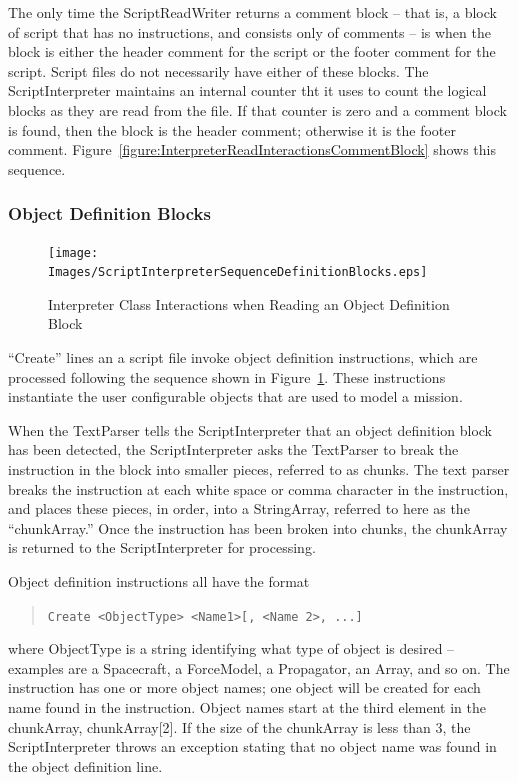 The only time the ScriptReadWriter returns a comment block -- that is, a block of script that has
no instructions, and consists only of comments -- is when the block is either the header comment
for the script or the footer comment for the script.  Script files do not necessarily have either
of these blocks.  The ScriptInterpreter maintains an internal counter tht it uses to count the
logical blocks as they are read from the file.  If that counter is zero and a comment block is
found, then the block is the header comment; otherwise it is the footer comment.
Figure~\ref{figure:InterpreterReadInteractionsCommentBlock} shows this sequence.

\subsubsection{Object Definition Blocks}

\begin{figure}
\begin{center}
\texttt{[image: Images/ScriptInterpreterSequenceDefinitionBlocks.eps]}
\caption{\label{figure:InterpreterReadInteractionsDefinitionBlock}Interpreter Class Interactions
when Reading an Object Definition Block}
\end{center}
\end{figure}

``Create'' lines an a script file invoke object definition instructions, which are processed
following the sequence shown in Figure~\ref{figure:InterpreterReadInteractionsDefinitionBlock}.
These instructions instantiate the user configurable objects that are used to model a mission.

When the TextParser tells the ScriptInterpreter that an object definition block has been detected,
the ScriptInterpreter asks the TextParser to break the instruction in the block into smaller
pieces, referred to as chunks.  The text parser breaks the instruction at each white space or
comma character in the instruction, and places these pieces, in order, into a StringArray,
referred to here as the ``chunkArray.''  Once the instruction has been broken into chunks, the
chunkArray is returned to the ScriptInterpreter for processing.

Object definition instructions all have the format

\begin{quote}
   \texttt{Create <ObjectType> <Name1>[, <Name 2>, ...]}
\end{quote}

\noindent where ObjectType is a string identifying what type of object is desired -- examples are a
Spacecraft, a ForceModel, a Propagator, an Array, and so on.  The instruction has one or more
object names; one object will be created for each name found in the instruction.  Object names
start at the third element in the chunkArray, chunkArray[2].  If the size of the chunkArray is less
than 3, the ScriptInterpreter throws an exception stating that no object name was found in the
object definition line.

